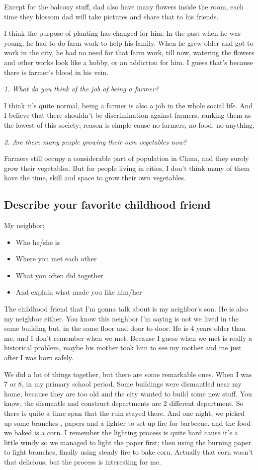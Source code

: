 \documentclass[conference]{IEEEtran}
\begin{document}
Except for the balcony stuff, dad also have many flowers inside the room, each time they blossom dad will take
pictures and share that to his friends.

I think the purpose of planting has changed for him.
In the past when he was young, he had to do farm work to help his family.
When he grew older and got to work in the city, he had no need for that farm work,
till now, watering the flowers and other works look like a hobby, or an addiction for him.
I guess that's because there is farmer's blood in his vein.

\textit{1. What do you think of the job of being a farmer?}

I think it's quite normal, being a farmer is also a job in the whole social life.
And I believe that there shouldn't be discrimination against farmers, ranking them as the lowest of this society;
reason is simple cause no farmers, no food, no anything.

\textit{2. Are there many people growing their own vegetables now?}

Farmers still occupy a considerable part of population in China, and they surely grow their vegetables.
But for people living in cities, I don't think many of them have the time, skill and space to grow their own vegetables.


\subsection{Describe your favorite childhood friend}
My neighbor;

\begin{itemize}
    \item Who he/she is
    \item Where you met each other
    \item What you often did together
    \item And explain what made you like him/her
\end{itemize}
The childhood friend that I'm gonna talk about is my neighbor's son. He is also my neighbor either.
You know this neighbor I'm saying is not we lived in the same building but, in the same floor and door to door.
He is 4 years older than me, and I don't remember when we met.
Because I guess when we met is really a historical problem, maybe his mother took him to see my mother and me
just after I was born safely.

We did a lot of things together, but there are some remarkable ones.
When I was 7 or 8, in my primary school period. Some buildings were dismantled near my home, because
they are too old and the city wanted to build some new stuff.
You know, the dismantle and construct departments are 2 different department.
So there is quite a time span that the ruin stayed there. And one night, we picked up some branches
, papers and a lighter to set up fire for barbecue.
and the food we baked is a corn.
I remember the lighting process is quite hard cause it's a little windy so we managed to light the paper first;
then using the burning paper to light branches, finally using steady fire to bake corn.
Actually that corn wasn't that delicious, but the process is interesting for me.
\end{document}
